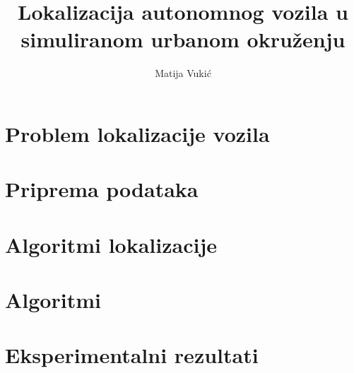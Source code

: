 \documentclass[times, utf8, diplomski]{fer}
\begin{document}

\title{Lokalizacija autonomnog vozila u simuliranom urbanom okruženju}

\author{Matija Vukić}

\maketitle

\izvornik


\tableofcontents

\chapter{Problem lokalizacije vozila}

\chapter{Priprema podataka}

\chapter{Algoritmi lokalizacije}

\chapter{Algoritmi}

\chapter{Eksperimentalni rezultati}
\end{document}
